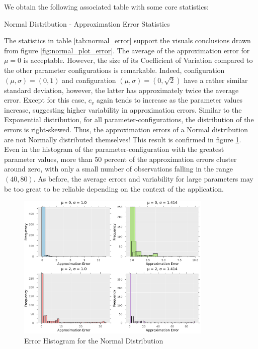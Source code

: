 We obtain the following associated table with some core statistics:
\begin{table}[H]
    \centering

\caption{Normal Distribution - Approximation Error Statistics} 
\label{tab:normal_error}
\end{table}
The statistics in table \ref{tab:normal_error} support the visuals conclusions drawn from figure \ref{fig:normal_plot_error}. The average of the approximation error for \(\mu = 0\) is acceptable. However, the size of its Coefficient of Variation compared to the other parameter configurations is remarkable. Indeed, configuration \((\mu, \sigma) = (0, 1)\) and configuration \((\mu, \sigma) = (0, \sqrt{2})\) have a rather similar standard deviation, however, the latter has approximately twice the average error. Except for this case, \(c_v\) again tends to increase as the parameter values increase, suggesting higher variability in approximation errors. Similar to the Exponential distribution, for all parameter-configurations, the distribution of the errors is right-skewed. Thus, the approximation errors of a Normal distribution are not Normally distributed themselves! This result is confirmed in figure \ref{fig:error_histogram}. Even in the histogram of the parameter-configuration with the greatest parameter values, more than 50 percent of the approximation errors cluster around zero, with only a small number of observations falling in the range \((40, 80)\). As before, the average errors and variability for large parameters may be too great to be reliable depending on the context of the application.

\begin{figure}[H]
    \centering
    \includegraphics[width=0.83\textwidth]{figures/error_histogram.pdf}
    \caption{Error Histogram for the Normal Distribution}
    \label{fig:error_histogram}
\end{figure}

